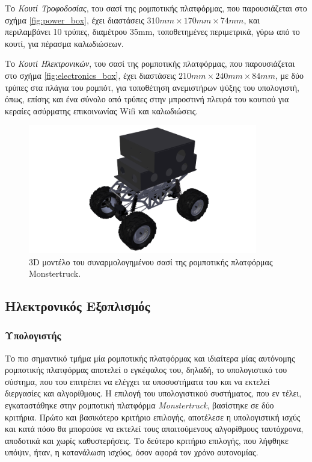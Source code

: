 \bigskip
Το \textit{Κουτί Τροφοδοσίας}, του σασί της ρομποτικής πλατφόρμας, που παρουσιάζεται στο σχήμα \ref{fig:power_box}, έχει διαστάσεις $310mm \times 170mm \times 74mm$, και περιλαμβάνει 10 τρύπες, διαμέτρου 35mm, τοποθετημένες περιμετρικά, γύρω από το κουτί, για πέρασμα καλωδιώσεων.

\bigskip
Το \textit{Κουτί Ηλεκτρονικών}, του σασί της ρομποτικής πλατφόρμας, που παρουσιάζεται στο σχήμα \ref{fig:electronics_box}, έχει διαστάσεις $210mm\times 240mm\times 84mm$, με δύο τρύπες στα πλάγια του ρομπότ, για τοποθέτηση ανεμιστήρων ψύξης του υπολογιστή, όπως, επίσης και ένα σύνολο από τρύπες στην μπροστινή πλευρά του κουτιού για κεραίες ασύρματης επικοινωνίας Wifi και καλωδιώσεις.

\begin{figure}[!ht]
	\begin{center}
		\includegraphics[width=10cm]{Chapters/Chapter2/Figures/base_diag.png}
		\caption{3D μοντέλο του συναρμολογημένου σασί της ρομποτικής πλατφόρμας Monstertruck.}
		\label{fig:chassis}
	\end{center}
\end{figure}

\bigskip
\subsection{Ηλεκτρονικός Εξοπλισμός}

\bigskip
\subsubsection{Υπολογιστής}
Το πιο σημαντικό τμήμα μία ρομποτικής πλατφόρμας και ιδιαίτερα μίας αυτόνομης ρομποτικής πλατφόρμας αποτελεί ο εγκέφαλος του, δηλαδή, το υπολογιστικό του σύστημα, που του επιτρέπει να ελέγχει τα υποσυστήματα του και να εκτελεί διεργασίες και αλγορίθμους. Η επιλογή του υπολογιστικού συστήματος, που εν τέλει, εγκαταστάθηκε στην ρομποτική πλατφόρμα \textit{Monstertruck}, βασίστηκε σε δύο κριτήρια. Πρώτο και βασικότερο κριτήριο επιλογής, αποτέλεσε η υπολογιστική ισχύς και κατά πόσο θα μπορούσε να εκτελεί τους απαιτούμενους αλγορίθμους ταυτόχρονα, αποδοτικά και χωρίς καθυστερήσεις. Το δεύτερο κριτήριο επιλογής, που λήφθηκε υπόψιν, ήταν, η κατανάλωση ισχύος, όσον αφορά τον χρόνο αυτονομίας.

